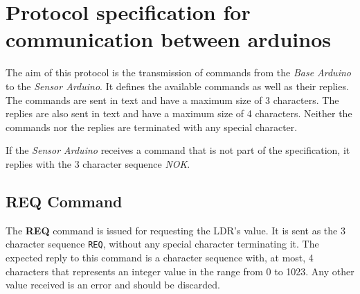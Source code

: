 \documentclass[conference, a4paper]{IEEEtran}
\begin{document}




%
%
%


\appendices

\section{Protocol specification for communication between arduinos}
\label{prot_ard}

The aim of this protocol is the transmission of commands from the \textit{Base Arduino} to the \textit{Sensor Arduino}. It defines the available commands as well as their replies. The commands are sent in text and have a maximum size of 3 characters. The replies are also sent in text and have a maximum size of 4 characters. Neither the commands nor the replies are terminated with any special character.

If the \textit{Sensor Arduino} receives a command that is not part of the specification, it replies with the 3 character sequence \textit{NOK}.

\subsection{REQ Command}

The \textbf{REQ} command is issued for requesting the LDR's value. It is sent as the 3 character sequence \texttt{REQ}, without any special character terminating it. The expected reply to this command is a character sequence with, at most, 4 characters that represents an integer value in the range from 0 to 1023. Any other value received is an error and should be discarded.
\end{document}
